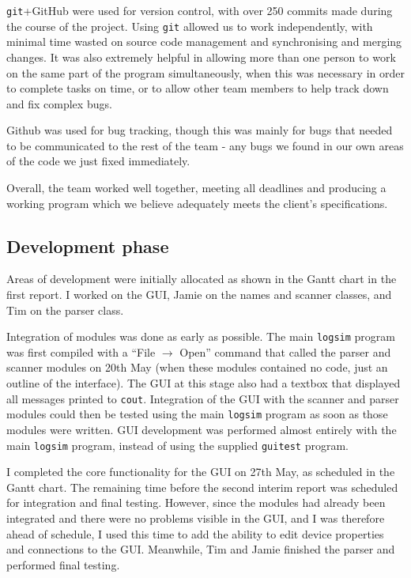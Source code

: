 \documentclass[a4paper,10pt]{article}
\begin{document}
\texttt{git}+GitHub were used for version control, with over 250 commits made during the course of the project. Using \texttt{git} allowed us to work independently, with minimal time wasted on source code management and synchronising and merging changes. It was also extremely helpful in allowing more than one person to work on the same part of the program simultaneously, when this was necessary in order to complete tasks on time, or to allow other team members to help track down and fix complex bugs.

Github was used for bug tracking, though this was mainly for bugs that needed to be communicated to the rest of the team - any bugs we found in our own areas of the code we just fixed immediately.

Overall, the team worked well together, meeting all deadlines and producing a working program which we believe adequately meets the client's specifications. 

\subsection{Development phase}
Areas of development were initially allocated as shown in the Gantt chart in the first report. I worked on the GUI, Jamie on the names and scanner classes, and Tim on the parser class. 

Integration of modules was done as early as possible. The main \texttt{logsim} program was first compiled with a ``File $\rightarrow$ Open'' command that called the parser and scanner modules on 20th May (when these modules contained no code, just an outline of the interface). The GUI at this stage also had a textbox that displayed all messages printed to \texttt{cout}. Integration of the GUI with the scanner and parser modules could then be tested using the main \texttt{logsim} program as soon as those modules were written. GUI development was performed almost entirely with the main \texttt{logsim} program, instead of using the supplied \texttt{guitest} program. 

I completed the core functionality for the GUI on 27th May, as scheduled in the Gantt chart. The remaining time before the second interim report was scheduled for integration and final testing. However, since the modules had already been integrated and there were no problems visible in the GUI, and I was therefore ahead of schedule, I used this time to add the ability to edit device properties and connections to the GUI. Meanwhile, Tim and Jamie finished the parser and performed final testing. 
\end{document}

